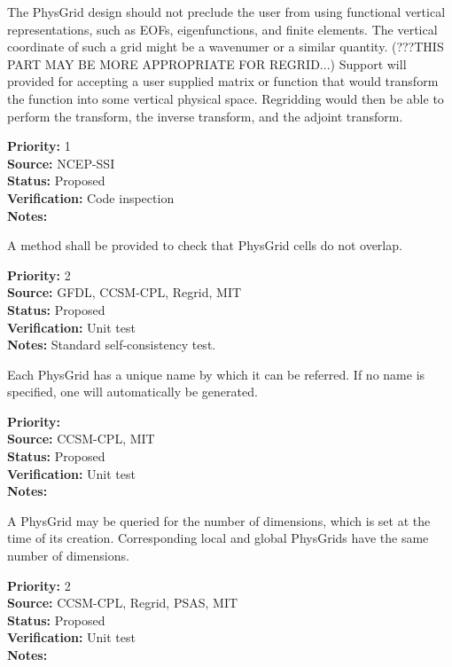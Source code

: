 The PhysGrid design should not preclude the user from using 
functional vertical representations, such as EOFs, eigenfunctions,
and finite elements.  The vertical coordinate of such a grid might be a wavenumer
or a similar quantity.
(???THIS PART MAY BE MORE APPROPRIATE FOR REGRID...) Support will provided for
accepting a user supplied matrix or function that would transform the function into some
vertical physical space. Regridding would then be able to perform the transform, the
inverse transform, and the adjoint transform.
\begin{reqlist}
{\bf Priority:} 1 \\
{\bf Source:} NCEP-SSI \\
{\bf Status:} Proposed \\
{\bf Verification:} Code inspection \\
{\bf Notes:} 
\end{reqlist}

A method shall be provided to check that PhysGrid cells do not overlap. 
\begin{reqlist}
{\bf Priority:} 2 \\
{\bf Source:} GFDL, CCSM-CPL, Regrid, MIT \\
{\bf Status:} Proposed \\
{\bf Verification:} Unit test\\
{\bf Notes:} Standard self-consistency test.
\end{reqlist}


Each PhysGrid has a unique name by which it can be referred.  If no name is
specified, one will automatically be generated.
\begin{reqlist}
{\bf Priority:} \\
{\bf Source:} CCSM-CPL, MIT \\
{\bf Status:} Proposed \\
{\bf Verification:} Unit test \\
{\bf Notes:} 
\end{reqlist}

A PhysGrid may be queried for the number of dimensions, which is
set at the time of its creation.  Corresponding local and global PhysGrids have
the same number of dimensions.
\begin{reqlist}
{\bf Priority:} 2 \\
{\bf Source:} CCSM-CPL, Regrid, 
PSAS, MIT  \\
{\bf Status:} Proposed \\
{\bf Verification:} Unit test \\
{\bf Notes:} 
\end{reqlist}

